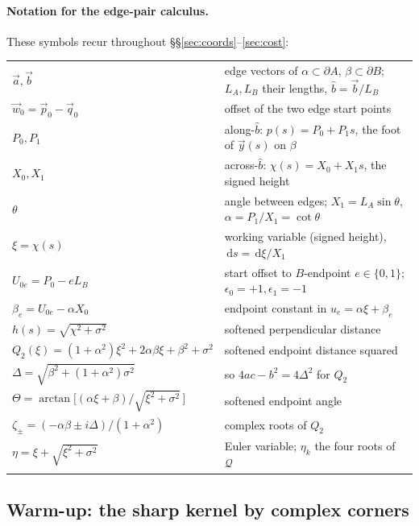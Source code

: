 \documentclass[11pt]{article}
\newcommand{\atan}{\operatorname{arctan}}
\newcommand{\dd}{\,\mathrm{d}}
\begin{document}
\paragraph{Notation for the edge-pair calculus.}  These symbols recur throughout
\S\S\ref{sec:coords}--\ref{sec:cost}:
\begin{center}\small
\begin{tabular}{ll}
$\vec a,\vec b$ & edge vectors of $\alpha\subset\partial A$, $\beta\subset\partial B$;
   $L_A,L_B$ their lengths, $\hat b=\vec b/L_B$\\
$\vec w_0=\vec p_0-\vec q_0$ & offset of the two edge start points\\
$P_0,P_1$ & along-$\hat b$: $p(s)=P_0+P_1s$, the foot of $\vec y(s)$ on $\beta$\\
$X_0,X_1$ & across-$\hat b$: $\chi(s)=X_0+X_1s$, the signed height\\
$\theta$ & angle between edges; $X_1=L_A\sin\theta$, $\alpha=P_1/X_1=\cot\theta$\\
$\xi=\chi(s)$ & working variable (signed height), $\dd s=\dd\xi/X_1$\\
$U_{0e}=P_0-eL_B$ & start offset to $B$-endpoint $e\in\{0,1\}$;
   $\epsilon_0{=}{+}1,\epsilon_1{=}{-}1$\\
$\beta_e=U_{0e}-\alpha X_0$ & endpoint constant in $u_e=\alpha\xi+\beta_e$\\
$h(s)=\sqrt{\chi^2+\sigma^2}$ & softened perpendicular distance\\
$Q_2(\xi)=(1{+}\alpha^2)\xi^2+2\alpha\beta\xi+\beta^2+\sigma^2$
   & softened endpoint distance squared\\
$\Delta=\sqrt{\beta^2+(1{+}\alpha^2)\sigma^2}$ & so $4ac-b^2=4\Delta^2$ for $Q_2$\\
$\Theta=\atan\!\big[(\alpha\xi{+}\beta)/\sqrt{\xi^2{+}\sigma^2}\,\big]$
   & softened endpoint angle\\
$\zeta_\pm=(-\alpha\beta\pm i\Delta)/(1{+}\alpha^2)$ & complex roots of $Q_2$\\
$\eta=\xi+\sqrt{\xi^2+\sigma^2}$ & Euler variable; $\eta_k$ the four roots of
   $\mathcal Q$
\end{tabular}
\end{center}

\subsection{Warm-up: the sharp kernel by complex corners}
\label{sec:sharp}
\end{document}
